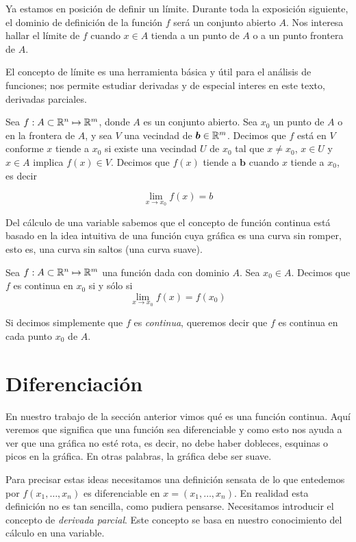 Ya estamos en posición de definir un límite. Durante toda la exposición siguiente, el dominio de definición de la función $f$ será un conjunto abierto $A$.
Nos interesa hallar el límite de $f$ cuando $x \in A$ tienda a un punto de $A$ o a un punto frontera de $A$.

El concepto de límite es una herramienta básica y útil para el análisis de funciones; nos permite estudiar derivadas y de especial interes en este texto,
derivadas parciales.

\begin{definition}[Límite]
    Sea $f:A \subset \mathbb{R}^{n} \mapsto \mathbb{R}^{m}$, donde $A$ es un conjunto abierto. Sea $x_{0}$ un punto de $A$ o en la frontera de $A$, y sea
    $V$ una vecindad de $\bm{b} \in \mathbb{R}^{m}$. Decimos que $f$ está en $V$ conforme $x$ tiende a $x_{0}$ si existe una vecindad $U$ de 
    $x_{0}$ tal que $x \neq x_{0}$, $x \in U$ y $x \in A$ implica $f(x) \in V$. Decimos que $f(x)$ tiende a $\bm{b}$ cuando
    $x$ tiende a $x_{0}$, es decir

    $$ \lim_{x \rightarrow x_{0}} f(x) = b $$
\end{definition}

Del cálculo de una variable sabemos que el concepto de función continua está basado en la idea intuitiva de una función cuya gráfica es una
curva sin romper, esto es, una curva sin saltos (una curva suave).

\begin{definition}
    Sea $f:A \subset \mathbb{R}^{n} \mapsto \mathbb{R}^{m}$ una función dada con dominio $A$. Sea $x_{0} \in A$. Decimos que $f$ es continua
    en $x_{0}$ si y sólo si
    $$ \lim_{x \rightarrow x_{0}} f(x) = f(x_{0})$$
\end{definition}

Si decimos simplemente que $f$ es \emph{continua}, queremos decir que $f$ es continua
en cada punto $x_{0}$ de $A$.

\section{Diferenciación}

En nuestro trabajo de la sección anterior vimos qué es una función continua. Aquí veremos que significa que una función sea diferenciable y como
esto nos ayuda a ver que una gráfica no esté rota, es decir, no debe haber dobleces, esquinas o picos en la gráfica. En otras palabras, la gráfica 
debe ser suave.

Para precisar estas ideas necesitamos una definición sensata de lo que entedemos por $f(x_{1}, \ldots, x_{n})$ es diferenciable en $x=(x_{1}, \ldots, x_{n})$.
En realidad esta definición no es tan sencilla, como pudiera pensarse. Necesitamos introducir el concepto de \emph{derivada parcial}. Este concepto se
basa en nuestro conocimiento del cálculo en una variable.

